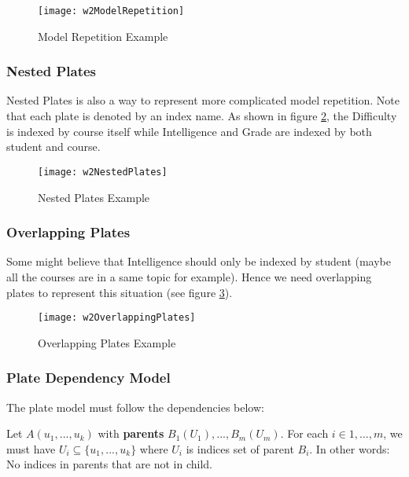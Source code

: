 \begin{figure}[!ht]
	\centering
	\texttt{[image: w2ModelRepetition]}
	\caption{Model Repetition Example}
	\label{w2ModelRepetition}
\end{figure}

\subsubsection{Nested Plates}
Nested Plates is also a way to represent more complicated model repetition. Note that each plate is denoted by an index name. As shown in figure \ref{w2NestedPlates}, the Difficulty is indexed by course itself while Intelligence and Grade are indexed by both student and course. 

\begin{figure}[!ht]
	\centering
	\texttt{[image: w2NestedPlates]}
	\caption{Nested Plates Example}
	\label{w2NestedPlates}
\end{figure}

\subsubsection{Overlapping Plates}
Some might believe that Intelligence should only be indexed by student (maybe all the courses are in a same topic for example). Hence we need overlapping plates to represent this situation (see figure \ref{w2OverlappingPlates}).

\begin{figure}[!ht]
	\centering
	\texttt{[image: w2OverlappingPlates]}
	\caption{Overlapping Plates Example}
	\label{w2OverlappingPlates}
\end{figure}

\subsubsection{Plate Dependency Model}
The plate model must follow the dependencies below:
\begin{defi}
Let $A(u_1,...,u_k)$ with \textbf{parents} $B_1(U_1),...,B_m(U_m)$. For each $i \in 1,...,m$, we must have $U_i \subseteq \{u_1, ..., u_k\}$ where $U_i$ is indices set of parent $B_i$. In other words: No indices in parents that are not in child.  	
\end{defi}
